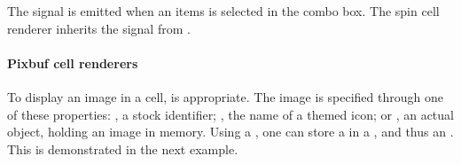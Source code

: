 The  signal is emitted when an items is selected in
the combo box. The spin cell renderer inherits the 
signal from .

\paragraph{Pixbuf cell renderers}

To display an image in a cell,  is
appropriate. The image is specified through one of these properties:
, a stock identifier; , the name of a
themed icon; or , an actual  object,
holding an image in memory. Using a , one can store a
 in a , and thus an
. This is demonstrated in the next example.



